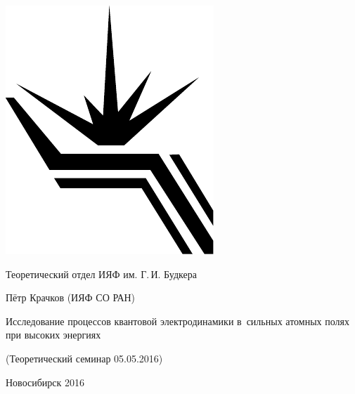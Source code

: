 \documentclass[12pt,pagesize,paper=landscape,paper=192mm:108mm]{scrbook}
\begin{document}
\begin{titlepage}
  \vspace*{-0.5em}
  \begin{center}    
    \hspace*{3em}
    \begin{minipage}[t]{3em}
      \includegraphics[width=\textwidth]{../BINP-logo}
    \end{minipage}\hfill
    Теоретический отдел ИЯФ им. Г.\,И. Будкера\hfill
    \hspace*{7em}
    \bigskip

    \large
    Пётр Крачков  (ИЯФ СО РАН)
    \bigskip
    \bigskip

    \LARGE Исследование процессов квантовой электродинамики в~сильных
    атомных полях при высоких энергиях
    
    \bigskip

    \normalsize
    (Теоретический семинар 05.05.2016)
    \vfill

    \normalsize

    \normalsize \ccbysa\hspace{0.5em}  Новосибирск 2016
  \end{center}
\end{titlepage}
\end{document}
